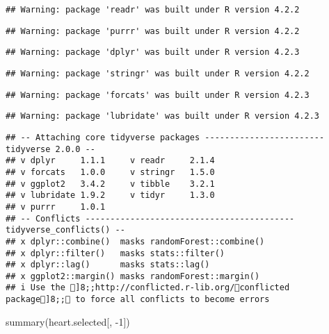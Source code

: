 \documentclass[
]{article}
\newenvironment{Shaded}{\begin{snugshade}}{\end{snugshade}}
\newcommand{\DecValTok}[1]{\textcolor[rgb]{0.00,0.00,0.81}{#1}}
\newcommand{\FunctionTok}[1]{\textcolor[rgb]{0.00,0.00,0.00}{#1}}
\newcommand{\NormalTok}[1]{#1}
\newcommand{\SpecialCharTok}[1]{\textcolor[rgb]{0.00,0.00,0.00}{#1}}
\begin{document}
\begin{verbatim}
## Warning: package 'readr' was built under R version 4.2.2
\end{verbatim}

\begin{verbatim}
## Warning: package 'purrr' was built under R version 4.2.2
\end{verbatim}

\begin{verbatim}
## Warning: package 'dplyr' was built under R version 4.2.3
\end{verbatim}

\begin{verbatim}
## Warning: package 'stringr' was built under R version 4.2.2
\end{verbatim}

\begin{verbatim}
## Warning: package 'forcats' was built under R version 4.2.3
\end{verbatim}

\begin{verbatim}
## Warning: package 'lubridate' was built under R version 4.2.3
\end{verbatim}

\begin{verbatim}
## -- Attaching core tidyverse packages ------------------------ tidyverse 2.0.0 --
## v dplyr     1.1.1     v readr     2.1.4
## v forcats   1.0.0     v stringr   1.5.0
## v ggplot2   3.4.2     v tibble    3.2.1
## v lubridate 1.9.2     v tidyr     1.3.0
## v purrr     1.0.1     
## -- Conflicts ------------------------------------------ tidyverse_conflicts() --
## x dplyr::combine()  masks randomForest::combine()
## x dplyr::filter()   masks stats::filter()
## x dplyr::lag()      masks stats::lag()
## x ggplot2::margin() masks randomForest::margin()
## i Use the ]8;;http://conflicted.r-lib.org/conflicted package]8;; to force all conflicts to become errors
\end{verbatim}

\begin{Shaded}
\begin{Highlighting}[]
\FunctionTok{summary}\NormalTok{(heart.selected[, }\SpecialCharTok{{-}}\DecValTok{1}\NormalTok{])}
\end{Highlighting}
\end{Shaded}
\end{document}
